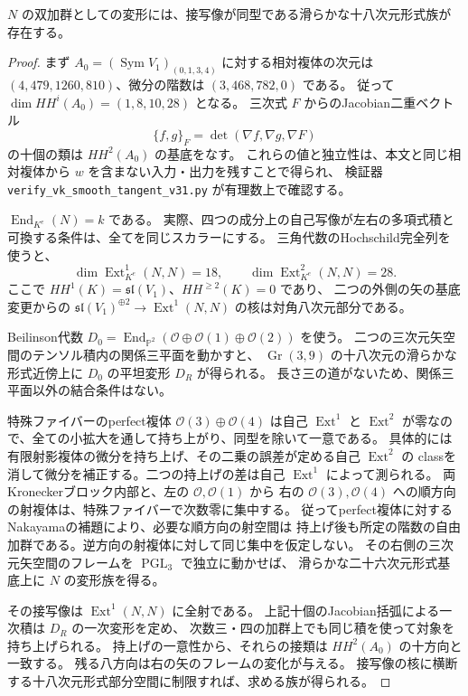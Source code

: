 \begin{lemma}\label{lem:N-unobstructed-v31}
$N$ の双加群としての変形には、接写像が同型である滑らかな十八次元形式族が存在する。
\end{lemma}
\begin{proof}
まず $A_0=(\operatorname{Sym}V_1)_{(0,1,3,4)}$ に対する相対複体の次元は
$(4,479,1260,810)$、微分の階数は $(3,468,782,0)$ である。
従って $\dim HH^i(A_0)=(1,8,10,28)$ となる。
三次式 $F$ からのJacobian二重ベクトル
\[
 \{f,g\}_F=\det(\nabla f,\nabla g,\nabla F)
\]
の十個の類は $HH^2(A_0)$ の基底をなす。
これらの値と独立性は、本文と同じ相対複体から $w$ を含まない入力・出力を残すことで得られ、
検証器 \texttt{verify\_vk\_smooth\_tangent\_v31.py} が有理数上で確認する。

$\operatorname{End}_{K^e}(N)=k$ である。
実際、四つの成分上の自己写像が左右の多項式積と可換する条件は、全てを同じスカラーにする。
三角代数のHochschild完全列\cite{GG}を使うと、
\[
 \dim\operatorname{Ext}^1_{K^e}(N,N)=18,
 \qquad \dim\operatorname{Ext}^2_{K^e}(N,N)=28.
\]
ここで $HH^1(K)=\mathfrak{sl}(V_1)$、$HH^{\ge2}(K)=0$ であり、
二つの外側の矢の基底変更からの
$\mathfrak{sl}(V_1)^{\oplus2}\to\operatorname{Ext}^1(N,N)$ の核は対角八次元部分である。

Beilinson代数 $D_0=\operatorname{End}_{\mathbb P^2}(\mathcal O\oplus\mathcal O(1)\oplus\mathcal O(2))$
を使う\cite{Beilinson}。
二つの三次元矢空間のテンソル積内の関係三平面を動かすと、
$\operatorname{Gr}(3,9)$ の十八次元の滑らかな形式近傍上に $D_0$ の平坦変形 $D_R$ が得られる。
長さ三の道がないため、関係三平面以外の結合条件はない。

特殊ファイバーのperfect複体 $\mathcal O(3)\oplus\mathcal O(4)$ は自己 $\operatorname{Ext}^1$ と
$\operatorname{Ext}^2$ が零なので、全ての小拡大を通して持ち上がり、同型を除いて一意である。
具体的には有限射影複体の微分を持ち上げ、その二乗の誤差が定める自己 $\operatorname{Ext}^2$ の
classを消して微分を補正する。二つの持上げの差は自己 $\operatorname{Ext}^1$ によって測られる。
両Kroneckerブロック内部と、左の $\mathcal O,\mathcal O(1)$ から
右の $\mathcal O(3),\mathcal O(4)$ への順方向の射複体は、特殊ファイバーで次数零に集中する。
従ってperfect複体に対するNakayamaの補題により、必要な順方向の射空間は
持上げ後も所定の階数の自由加群である。逆方向の射複体に対して同じ集中を仮定しない。
その右側の三次元矢空間のフレームを $\operatorname{PGL}_3$ で独立に動かせば、
滑らかな二十六次元形式基底上に $N$ の変形族を得る。

その接写像は $\operatorname{Ext}^1(N,N)$ に全射である。
上記十個のJacobian括弧による一次積は $D_R$ の一次変形を定め、
次数三・四の加群上でも同じ積を使って対象を持ち上げられる。
持上げの一意性から、それらの接類は $HH^2(A_0)$ の十方向と一致する。
残る八方向は右の矢のフレームの変化が与える。
接写像の核に横断する十八次元形式部分空間に制限すれば、求める族が得られる。
\end{proof}

